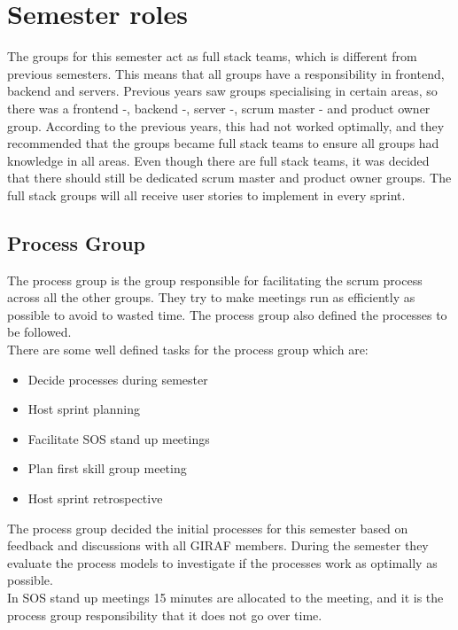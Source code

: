 \section{Semester roles}
The groups for this semester act as full stack teams, which is different from previous semesters. 
This means that all groups have a responsibility in frontend, backend and servers.
Previous years saw groups specialising in certain areas, so there was a frontend -, backend -, server -, scrum master - and product owner group. 
According to the previous years, this had not worked optimally, and they recommended that the groups became full stack teams to ensure all groups had knowledge in all areas.
Even though there are full stack teams, it was decided that there should still be dedicated scrum master and product owner groups. 
The full stack groups will all receive user stories to implement in every sprint.

\subsection{Process Group}
The process group is the group responsible for facilitating the scrum process across all the other groups.
They try to make meetings run as efficiently as possible to avoid to wasted time.
The process group also defined the processes to be followed.
\\
There are some well defined tasks for the process group which are:
\begin{itemize}
    \item Decide processes during semester
    \item Host sprint planning
    \item Facilitate SOS stand up meetings
    \item Plan first skill group meeting
    \item Host sprint retrospective
\end{itemize}
\noindent
The process group decided the initial processes for this semester based on feedback and discussions with all GIRAF members.
During the semester they evaluate the process models to investigate if the processes work as optimally as possible.
\\
In SOS stand up meetings 15 minutes are allocated to the meeting, and it is the process group responsibility that it does not go over time.

